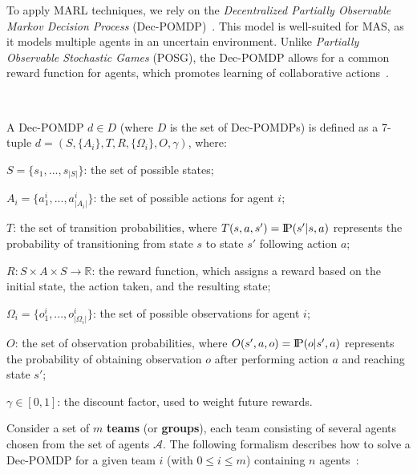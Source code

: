 \documentclass[sigconf,anonymous]{aamas}
\newcommand{\probP}{\text{I\kern-0.15em P}}
\begin{document}
To apply MARL techniques, we rely on the \textit{Decentralized Partially Observable Markov Decision Process} (Dec-POMDP)~\citep{Oliehoek2016}. This model is well-suited for MAS, as it models multiple agents in an uncertain environment. Unlike \textit{Partially Observable Stochastic Games} (POSG), the Dec-POMDP allows for a common reward function for agents, which promotes learning of collaborative actions~\citep{Beynier2013}.

\

A Dec-POMDP $d \in D$ (where $D$ is the set of Dec-POMDPs) is defined as a 7-tuple $d = (S, \{A_i\}, T, R, \{\Omega_i\}, O, \gamma)$, where:
%
\begin{itemize*}[label={},itemjoin={; \quad}]
    \item $S = \{s_1,...,s_{|S|}\}$: the set of possible states;
    \item $A_{i} = \{a_{1}^{i},...,a_{|A_{i}|}^{i}\}$: the set of possible actions for agent $i$;
    \item $T$: the set of transition probabilities, where $T(s,a,s') = \probP(s'|s,a)$ represents the probability of transitioning from state $s$ to state $s'$ following action $a$;
    \item $R: S \times A \times S \rightarrow \mathbb{R}$: the reward function, which assigns a reward based on the initial state, the action taken, and the resulting state;
    \item $\Omega_{i} = \{o_{1}^{i},...,o_{|\Omega_{i}|}^{i}\}$: the set of possible observations for agent $i$;
    \item $O$: the set of observation probabilities, where $O(s',a,o) = \probP(o|s',a)$ represents the probability of obtaining observation $o$ after performing action $a$ and reaching state $s'$;
    \item $\gamma \in [0,1]$: the discount factor, used to weight future rewards.
\end{itemize*}

Consider a set of $m$ \textbf{teams} (or \textbf{groups}), each team consisting of several agents chosen from the set of agents $\mathcal{A}$. The following formalism describes how to solve a Dec-POMDP for a given team $i$ (with $0 \leq i \leq m$) containing $n$ agents~\citep{Beynier2013,Albrecht2024}:
\end{document}
